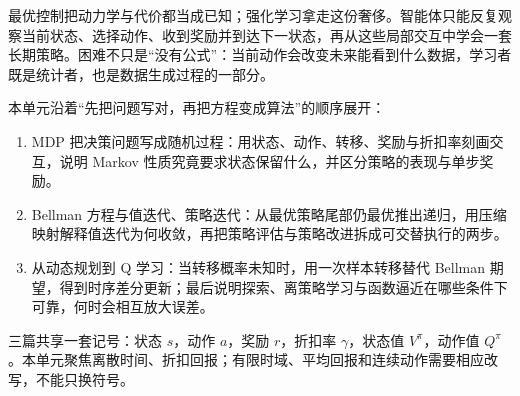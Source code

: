 最优控制把动力学与代价都当成已知；强化学习拿走这份奢侈。智能体只能反复观察当前状态、选择动作、收到奖励并到达下一状态，再从这些局部交互中学会一套长期策略。困难不只是``没有公式''：当前动作会改变未来能看到什么数据，学习者既是统计者，也是数据生成过程的一部分。

本单元沿着``先把问题写对，再把方程变成算法''的顺序展开：

\begin{enumerate}
\def\labelenumi{\arabic{enumi}.}
\tightlist
\item
  MDP 把决策问题写成随机过程：用状态、动作、转移、奖励与折扣率刻画交互，说明 Markov 性质究竟要求状态保留什么，并区分策略的表现与单步奖励。
\item
  Bellman 方程与值迭代、策略迭代：从最优策略尾部仍最优推出递归，用压缩映射解释值迭代为何收敛，再把策略评估与策略改进拆成可交替执行的两步。
\item
  从动态规划到 Q 学习：当转移概率未知时，用一次样本转移替代 Bellman 期望，得到时序差分更新；最后说明探索、离策略学习与函数逼近在哪些条件下可靠，何时会相互放大误差。
\end{enumerate}

三篇共享一套记号：状态 \(s\)，动作 \(a\)，奖励 \(r\)，折扣率 \(\gamma\)，状态值 \(V^\pi\)，动作值 \(Q^\pi\)。本单元聚焦离散时间、折扣回报；有限时域、平均回报和连续动作需要相应改写，不能只换符号。
